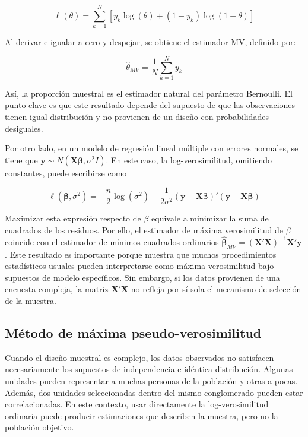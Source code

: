 \documentclass[
  spanish,
  12pt,
]{book}
\begin{document}
\[
\ell(\theta)
= \sum_{k=1}^{N}
\left[
y_k\log(\theta)
+(1-y_k)\log(1-\theta)
\right]
\]

Al derivar e igualar a cero y despejar, se obtiene el estimador MV, definido por:

\[
\hat{\theta}_{MV}
= \frac{1}{N}\sum_{k=1}^{N}y_k
\]

Así, la proporción muestral es el estimador natural del parámetro Bernoulli. El punto clave es que este resultado depende del supuesto de que las observaciones tienen igual distribución y no provienen de un diseño con probabilidades desiguales.

Por otro lado, en un modelo de regresión lineal múltiple con errores normales, se tiene que \(\mathbf{y} \sim N(\mathbf{X}\boldsymbol{\beta},\sigma^2 I)\). En este caso, la log-verosimilitud, omitiendo constantes, puede escribirse como

\[
\ell(\boldsymbol{\beta},\sigma^2) = -\frac{n}{2}\log(\sigma^2) -\frac{1}{2\sigma^2}(\mathbf{y}-\mathbf{X}\boldsymbol{\beta})'(\mathbf{y}-\mathbf{X}\boldsymbol{\beta})
\]

Maximizar esta expresión respecto de \(\beta\) equivale a minimizar la suma de cuadrados de los residuos. Por ello, el estimador de máxima verosimilitud de \(\beta\) coincide con el estimador de mínimos cuadrados ordinarios \(\hat{\boldsymbol{\beta}}_{MV} = (\mathbf{X}'\mathbf{X})^{-1}\mathbf{X}'\mathbf{y}\). Este resultado es importante porque muestra que muchos procedimientos estadísticos usuales pueden interpretarse como máxima verosimilitud bajo supuestos de modelo específicos. Sin embargo, si los datos provienen de una encuesta compleja, la matriz \(\mathbf{X}'\mathbf{X}\) no refleja por sí sola el mecanismo de selección de la muestra.

\subsection{Método de máxima pseudo-verosimilitud}\label{sec-mpv-formal}

Cuando el diseño muestral es complejo, los datos observados no satisfacen necesariamente los supuestos de independencia e idéntica distribución. Algunas unidades pueden representar a muchas personas de la población y otras a pocas. Además, dos unidades seleccionadas dentro del mismo conglomerado pueden estar correlacionadas. En este contexto, usar directamente la log-verosimilitud ordinaria puede producir estimaciones que describen la muestra, pero no la población objetivo.
\end{document}
